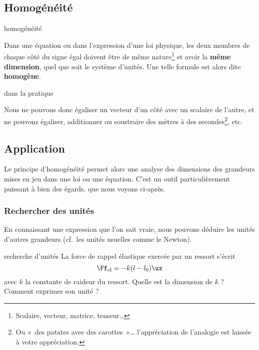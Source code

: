 \documentclass[../main/main.tex]{subfiles}
\begin{document}
\subsection{Homogénéité}

\begin{tcbraster}[raster columns=2, raster equal height=rows]
    \begin{prop}[label=prop:homo, hand]{homogénéité}

        Dans une équation ou dans l'expression d'une loi physique, les deux
        membres de chaque côté du signe égal doivent être de même
        nature\footnote{Scalaire, vecteur, matrice, tenseur…} et avoir la
        \textbf{même dimension}, quel que soit le système d'unités. Une telle
        formule est alors dite \textbf{homogène}.

    \end{prop}
    \begin{impl}[label=impl:homo]{dans la pratique}

        Nous ne pouvons donc égaliser un vecteur d'un côté avec un scalaire de
        l'autre, et ne pouvons égaliser, additionner ou soustraire des mètres à
        des secondes\footnote{Ou «~des patates avec des carottes~»…
        l'appréciation de l'analogie est laissée à votre appréciation.}, etc.

    \end{impl}
\end{tcbraster}

\subsection{Application}

Le principe d'homogénéité permet alors une analyse des dimensions des grandeurs
mises en jeu dans une loi ou une équation. C'est un outil particulièrement
puissant à bien des égards, que nous voyons ci-après.

\subsubsection{Rechercher des unités}

En connaissant une expression que l'on sait vraie, nous pouvons déduire les
unités d'autres grandeurs (cf.\ les unités usuelles comme le Newton).

\begin{exem}[label=exem:homounit]{recherche d'unités}
    La force de rappel élastique exercée par un ressort s'écrit
    \[\Ff_{\rm el} = -k(l-l_0)\ux\]
    avec $k$ la constante de raideur du ressort. Quelle est la dimension de $k$
    ? Comment exprimer son unité ?
    \tcblower
    \vspace{3cm}
\end{exem}
\end{document}
